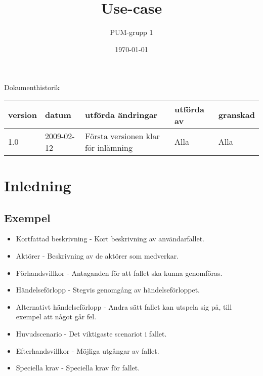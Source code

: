 

\ifpdf
\else
\fi

\title{Use-case}
\author{PUM-grupp 1}
\date{\today}



\maketitle\thispagestyle{empty}

\newpage

{\centering \Large{Dokumenthistorik\\}}

\vspace{10pt}
\begin{tabularx}{\textwidth}{ |l|l|X|l|l| }
  \hline
    \textbf{version} & \textbf{datum} & \textbf{utförda ändringar} & \textbf{utförda av} & \textbf{granskad} \\
	\hline 
  1.0 & 2009-02-12 &  Första versionen klar för inlämning  & Alla & Alla   \\
  \hline
\end{tabularx}

\newpage
\setcounter{tocdepth}{2}
\tableofcontents
\newpage

\section{Inledning}


\subsection{Exempel}
\begin{itemize}
	\item Kortfattad beskrivning - Kort beskrivning av användarfallet.
	\item Aktörer - Beskrivning av de aktörer som medverkar.
	\item Förhandsvillkor - Antaganden för att fallet ska kunna genomföras.
	\item Händelseförlopp - Stegvis genomgång av händelseförloppet.
	\item Alternativt händelseförlopp - Andra sätt fallet kan utspela sig på, till exempel att något går fel.
	\item Huvudscenario - Det viktigaste scenariot i fallet.
	\item Efterhandsvillkor - Möjliga utgångar av fallet.
	\item Speciella krav - Speciella krav för fallet.
\end{itemize}


